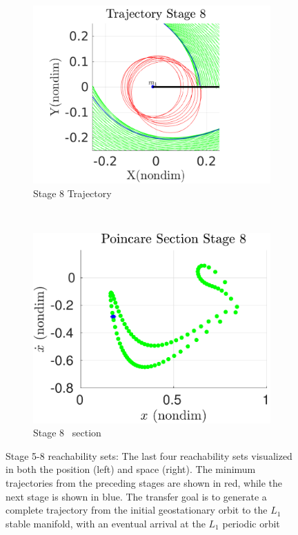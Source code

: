 \begin{figure}[htbp]
    \begin{subfigure}[htbp]{0.5\textwidth} 
        \includegraphics[width=\textwidth, keepaspectratio]{figures/2017_JAS/stage8_trajectory_zoom.pdf} 
        \caption{Stage 8 Trajectory~\label{fig:stage8_trajecotry_zoom}} 
    \end{subfigure}~
    \begin{subfigure}[htbp]{0.5\textwidth} 
        \includegraphics[width=\textwidth, keepaspectratio]{figures/2017_JAS/stage8_poincare.pdf} 
        \caption{Stage 8 \Poincare~section \label{fig:stage8_poincare}} 
    \end{subfigure}   
    \caption{Stage 5-8 reachability sets: The last four reachability sets visualized in both the position (left) and \Poincare space (right).
        The minimum trajectories from the preceding stages are shown in red, while the next stage is shown in blue.
    The transfer goal is to generate a complete trajectory from the initial geostationary orbit to the \( L_1 \) stable manifold, with an eventual arrival at the \( L_1 \) periodic orbit~\label{fig:stage5to8_reachability}}
\end{figure}

